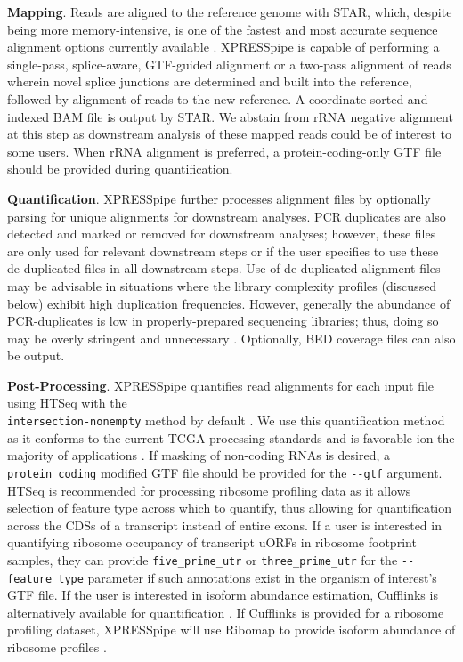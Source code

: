 \documentclass[10pt, oneside]{article}
\begin{document}
\noindent\textbf{Mapping}. Reads are aligned to the reference genome with STAR, which, despite being more memory-intensive, is one of the fastest and most accurate sequence alignment options currently available \cite{star, alignment_benchmark, alignment_benchmark2}. XPRESSpipe is capable of performing a single-pass, splice-aware, GTF-guided alignment or a two-pass alignment of reads wherein novel splice junctions are determined and built into the reference, followed by alignment of reads to the new reference. A coordinate-sorted and indexed BAM file is output by STAR. We abstain from rRNA negative alignment at this step as downstream analysis of these mapped reads could be of interest to some users. When rRNA alignment is preferred, a protein-coding-only GTF file should be provided during quantification. \par

\noindent\textbf{Quantification}. XPRESSpipe further processes alignment files by optionally parsing for unique alignments for downstream analyses. PCR duplicates are also detected and marked or removed for downstream analyses; however, these files are only used for relevant downstream steps or if the user specifies to use these de-duplicated files in all downstream steps. Use of de-duplicated alignment files may be advisable in situations where the library complexity profiles (discussed below) exhibit high duplication frequencies. However, generally the abundance of PCR-duplicates is low in properly-prepared sequencing libraries; thus, doing so may be overly stringent and unnecessary \cite{umi}. Optionally, BED coverage files can also be output.\par

\noindent\textbf{Post-Processing}. XPRESSpipe quantifies read alignments for each input file using HTSeq with the \\\texttt{intersection-nonempty} method by default \cite{htseq, count_benchmark}. We use this quantification method as it conforms to the current TCGA processing standards and is favorable ion the majority of applications \cite{tcga}. If masking of non-coding RNAs is desired, a \texttt{protein\_coding} modified GTF file should be provided for the \texttt{-{}-gtf} argument. HTSeq is recommended for processing ribosome profiling data as it allows selection of feature type across which to quantify, thus allowing for quantification across the CDSs of a transcript instead of entire exons. If a user is interested in quantifying ribosome occupancy of transcript uORFs in ribosome footprint samples, they can provide \texttt{five\_prime\_utr} or \texttt{three\_prime\_utr} for the \texttt{-{}-feature\_type} parameter if such annotations exist in the organism of interest's GTF file. If the user is interested in isoform abundance estimation, Cufflinks is alternatively available for quantification \cite{cufflinks, count_benchmark}. If Cufflinks is provided for a ribosome profiling dataset, XPRESSpipe will use Ribomap to provide isoform abundance of ribosome profiles \cite{ribomap_1, ribomap_2}.\par
\end{document}

